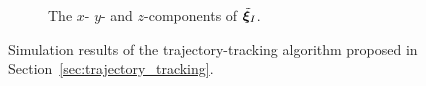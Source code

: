 \begin{figure}[htb]
\begin{minipage}{0.48\textwidth}
        \begin{subfigure}{\textwidth}
            
            \caption{The $x$- $y$- and $z$-components of $\tilde{\bm{\xi}}_I$.}
            \label{fig:trajectory_integral}
        \end{subfigure}
        \vspace*{-2mm}
    \end{minipage}
    \caption{Simulation results of the trajectory-tracking algorithm proposed in Section~\ref{sec:trajectory_tracking}.
    }
    \label{fig:trajectory_tracking}
\end{figure}
